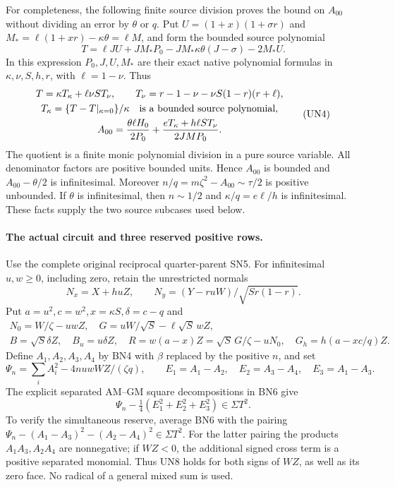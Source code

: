 For completeness, the following finite source division proves the
bound on $A_{00}$ without dividing an error by $\theta$ or $q$.
Put $U=(1+x)(1+\sigma r)$ and
$M_*=\ell(1+xr)-\kappa\theta=\ell M$, and form the bounded
source polynomial
\[
 T=\ell JU+JM_*P_0-JM_*\kappa\theta(J-\sigma)-2M_*U.
\]
In this expression $P_0,J,U,M_*$ are their exact native polynomial
formulas in $\kappa,\nu,S,h,r$, with $\ell=1-\nu$. Thus
\[
\begin{gathered}
 T=\kappa T_\kappa+\ell\nu S T_\nu,\qquad
 T_\nu=r-1-\nu-\nu S(1-r)(r+\ell),\\
 T_\kappa=\{T-T|_{\kappa=0}\}/\kappa
             \quad\hbox{is a bounded source polynomial},\\
 A_{00}=\frac{\theta\ell H_0}{2P_0}
            +\frac{eT_\kappa+h\ell S T_\nu}{2JMP_0}.
\end{gathered}\tag{UN4}
\]
The quotient is a finite monic polynomial division in a pure source
variable. All denominator factors are positive bounded units.
Hence $A_{00}$ is bounded and $A_{00}-\theta/2$ is infinitesimal.
Moreover $n/q=m\zeta^2-A_{00}\sim\tau/2$ is positive unbounded.
If $\theta$ is infinitesimal, then $n\sim1/2$ and
$\kappa/q=e\ell/h$ is infinitesimal. These facts supply the two
source subcases used below.

\paragraph{The actual circuit and three reserved positive rows.}
Use the complete original reciprocal quarter-parent SN5. For
infinitesimal $u,w\ge0$, including zero, retain the unrestricted
normals
\[
 N_x=X+huZ,\qquad N_y=(Y-ruW)/\sqrt{Sr(1-r)}.
 \tag{UN5}
\]
Put $a=u^2,c=w^2,x=\kappa S,\delta=c-q$ and
\[
\begin{gathered}
 N_0=W/\zeta-uwZ,\quad G=uW/\sqrt S-\ell\sqrt S\,wZ,\\
 B=\sqrt S\delta Z,\quad B_u=u\delta Z,\quad
 R=w(a-x)Z=\sqrt S\,G/\zeta-uN_0,\quad
 G_h=h(a-xc/q)Z.
\end{gathered}\tag{UN6}
\]
Define $A_1,A_2,A_3,A_4$ by BN4 with $\beta$ replaced by the
positive $n$, and set
\[
 \Psi_n=\sum_iA_i^2-4nuwWZ/(\zeta q),\qquad
 E_1=A_1-A_2,\quad E_2=A_3-A_4,\quad E_3=A_1-A_3.
 \tag{UN7}
\]
The explicit separated AM--GM square decompositions in BN6 give
\[
             \Psi_n-\tfrac14(E_1^2+E_2^2+E_3^2)\in\Sigma T^2.
 \tag{UN8}
\]
To verify the simultaneous reserve, average BN6 with the pairing
$\Psi_n-(A_1-A_3)^2-(A_2-A_4)^2\in\Sigma T^2$.
For the latter pairing the products $A_1A_3,A_2A_4$ are nonnegative;
if $WZ<0$, the additional signed cross term is a positive separated
monomial. Thus UN8 holds for both signs of $WZ$, as well as its
zero face. No radical of a general mixed sum is used.

